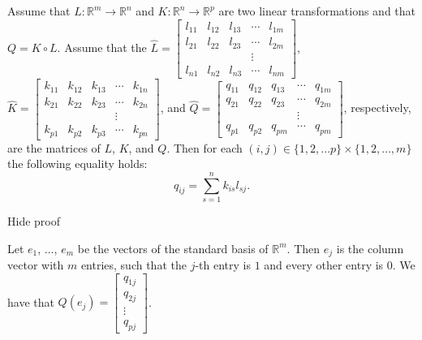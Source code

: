 Assume that \( L:\mathbb R^m\to\mathbb R^n \) and \( K:\mathbb R^n\to\mathbb R^p \) are two linear transformations and that \( Q=K\circ L \). Assume that the \( \hat L= \left[\begin{array}{ccccc} l_{11}&l_{12}&l_{13}& \cdots &l_{1m}\\ l_{21}&l_{22}&l_{23}&\cdots &l_{2m}\\ &&&\vdots&\\ l_{n1}&l_{n2}&l_{n3}&\cdots&l_{nm}\end{array}\right]\), \( \hat K= \left[\begin{array}{ccccc} k_{11}&k_{12}&k_{13}& \cdots &k_{1n}\\ k_{21}&k_{22}&k_{23}&\cdots &k_{2n}\\ &&&\vdots&\\ k_{p1}&k_{p2}&k_{p3}&\cdots&k_{pn}\end{array}\right]\), and \( \hat Q=\left[\begin{array}{ccccc} q_{11}&q_{12}&q_{13}& \cdots &q_{1m}\\ q_{21}&q_{22}&q_{23}&\cdots &q_{2m}\\ &&&\vdots&\\ q_{p1}&q_{p2}&q_{pm}&\cdots&q_{pm}\end{array}\right]\), respectively, are the matrices of \( L \), \( K \), and \( Q \). Then for each \( (i,j)\in\{1,2,\dots p\} \times\{1,2,\dots, m\} \) the following equality holds: \[ q_{ij}=\sum_{s=1}^n k_{is}l_{sj}.\]

Hide proof

Let \( e_1 \), \( \dots \), \( e_m \) be the vectors of the standard basis of \( \mathbb R^m \). Then \( e_j \) is the column vector with \( m \) entries, such that the \( j \)-th entry is \( 1 \) and every other entry is \( 0 \). We have that \( Q(e_j)=\left[\begin{array}{c}q_{1j}\\ q_{2j}\\\vdots\\ q_{pj}\end{array}\right]\).

